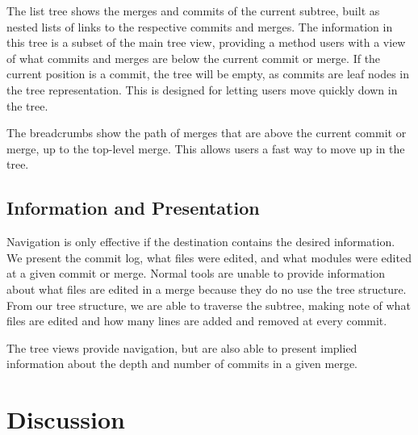 \documentclass[conference, draftclsnofoot]{IEEEtran}
\begin{document}
The list tree shows the merges and commits of the current subtree, built as
nested lists of links to the respective commits and merges. The information in
this tree is a subset of the main tree view, providing a method users with a
view of what commits and merges are below the current commit or merge. If the
current position is a commit, the tree will be empty, as commits are leaf
nodes in the tree representation. This is designed for letting users move
quickly down in the tree.



The breadcrumbs show the path of merges that are above the current commit or
merge, up to the top-level merge. This allows users a fast way to move up in
the tree.



\subsection{Information and Presentation}

Navigation is only effective if the destination contains the desired
information. We present the commit log, what files were edited, and what
modules were edited at a given commit or merge. Normal tools are unable to
provide information about what files are edited in a merge because they do no
use the tree structure. From our tree structure, we are able to traverse the
subtree, making note of what files are edited and how many lines are added and
removed at every commit.


The tree views provide navigation, but are also able to present implied
information about the depth and number of commits in a given merge.

\section{Discussion}
\end{document}
